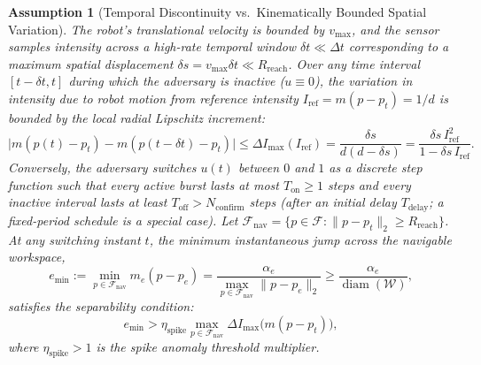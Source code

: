 \documentclass[12pt, a4paper]{article}
\newtheorem{assumption}{Assumption}
\begin{document}
\begin{assumption}[Temporal Discontinuity vs.\ Kinematically Bounded Spatial Variation]
\label{assump:discontinuity}
The robot's translational velocity is bounded by $v_{\max}$, and the sensor samples intensity across a high-rate temporal window $\delta t \ll \Delta t$ corresponding to a maximum spatial displacement $\delta s = v_{\max}\delta t \ll R_{\text{reach}}$. Over any time interval $[t - \delta t, t]$ during which the adversary is inactive ($u \equiv 0$), the variation in intensity due to robot motion from reference intensity $I_{\text{ref}} = m(p - p_t) = 1/d$ is bounded by the local radial Lipschitz increment:
\begin{equation}
    \bigl|m(p(t) - p_t) - m(p(t - \delta t) - p_t)\bigr| \le \Delta I_{\max}(I_{\text{ref}}) = \frac{\delta s}{d(d - \delta s)} = \frac{\delta s\, I_{\text{ref}}^2}{1 - \delta s\, I_{\text{ref}}}.
    \label{eq:lipschitz_bound}
\end{equation}
Conversely, the adversary switches $u(t)$ between $0$ and $1$ as a discrete step function such that every active burst lasts at most $T_{\text{on}} \ge 1$ steps and every inactive interval lasts at least $T_{\text{off}} > N_{\text{confirm}}$ steps (after an initial delay $T_{\text{delay}}$; a fixed-period schedule is a special case). Let $\mathcal{F}_{\text{nav}} = \{p \in \mathcal{F} : \|p - p_t\|_2 \ge R_{\text{reach}}\}$. At any switching instant $t$, the minimum instantaneous jump across the navigable workspace,
\begin{equation}
    e_{\min} := \min_{p \in \mathcal{F}_{\text{nav}}} m_e(p - p_e) = \frac{\alpha_e}{\max_{p \in \mathcal{F}_{\text{nav}}} \|p - p_e\|_2} \ge \frac{\alpha_e}{\operatorname{diam}(\mathcal{W})},
    \label{eq:emin_def}
\end{equation}
satisfies the separability condition:
\begin{equation}
    e_{\min} > \eta_{\text{spike}} \max_{p \in \mathcal{F}_{\text{nav}}} \Delta I_{\max}\!\bigl(m(p - p_t)\bigr),
    \label{eq:detectability_condition}
\end{equation}
where $\eta_{\text{spike}} > 1$ is the spike anomaly threshold multiplier.
\end{assumption}
\end{document}
